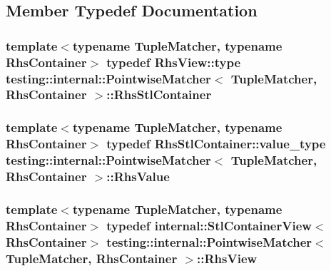 \subsection{Member Typedef Documentation}
\subsubsection[{\texorpdfstring{Rhs\+Stl\+Container}{RhsStlContainer}}]{\setlength{\rightskip}{0pt plus 5cm}template$<$typename Tuple\+Matcher, typename Rhs\+Container$>$ typedef {\bf Rhs\+View\+::type} {\bf testing\+::internal\+::\+Pointwise\+Matcher}$<$ Tuple\+Matcher, Rhs\+Container $>$\+::{\bf Rhs\+Stl\+Container}}\hypertarget{classtesting_1_1internal_1_1PointwiseMatcher_aadbaec8c93351f29b103816c2e397edd}{}\label{classtesting_1_1internal_1_1PointwiseMatcher_aadbaec8c93351f29b103816c2e397edd}
\subsubsection[{\texorpdfstring{Rhs\+Value}{RhsValue}}]{\setlength{\rightskip}{0pt plus 5cm}template$<$typename Tuple\+Matcher, typename Rhs\+Container$>$ typedef Rhs\+Stl\+Container\+::value\+\_\+type {\bf testing\+::internal\+::\+Pointwise\+Matcher}$<$ Tuple\+Matcher, Rhs\+Container $>$\+::{\bf Rhs\+Value}}\hypertarget{classtesting_1_1internal_1_1PointwiseMatcher_a9f7f1abbfa795033e1e1c1df385b4617}{}\label{classtesting_1_1internal_1_1PointwiseMatcher_a9f7f1abbfa795033e1e1c1df385b4617}
\subsubsection[{\texorpdfstring{Rhs\+View}{RhsView}}]{\setlength{\rightskip}{0pt plus 5cm}template$<$typename Tuple\+Matcher, typename Rhs\+Container$>$ typedef {\bf internal\+::\+Stl\+Container\+View}$<$Rhs\+Container$>$ {\bf testing\+::internal\+::\+Pointwise\+Matcher}$<$ Tuple\+Matcher, Rhs\+Container $>$\+::{\bf Rhs\+View}}\hypertarget{classtesting_1_1internal_1_1PointwiseMatcher_a215d397bfaf0f8bc948cb7b5ff9100c9}{}\label{classtesting_1_1internal_1_1PointwiseMatcher_a215d397bfaf0f8bc948cb7b5ff9100c9}


